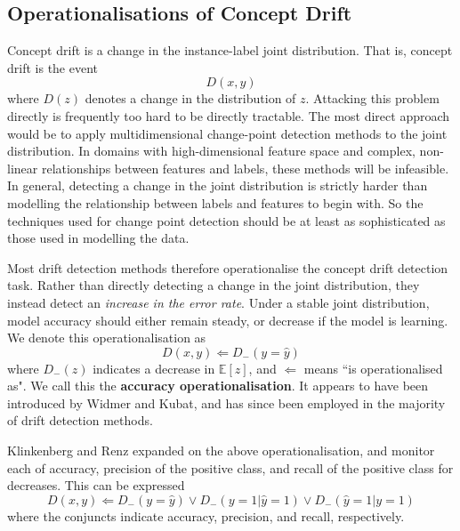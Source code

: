 \subsection{Operationalisations of Concept Drift} \label{Background:operationalisations}

Concept drift is a change in the instance-label joint distribution. That is, concept drift is the event
\begin{equation}
  D(x,y)
\end{equation}
where $D(z)$ denotes a change in the distribution of $z$. Attacking this problem directly is frequently too hard to be directly tractable. The most direct approach would be to apply multidimensional change-point detection methods to the joint distribution. In domains with high-dimensional feature space and complex, non-linear relationships between features and labels, these methods will be infeasible. In general, detecting a change in the joint distribution is strictly harder than modelling the relationship between labels and features to begin with. So the techniques used for change point detection should be at least as sophisticated as those used in modelling the data.

Most drift detection methods therefore operationalise the concept drift detection task. Rather than directly detecting a change in the joint distribution, they instead detect an {\it increase in the error rate}. Under a stable joint distribution, model accuracy should either remain steady, or decrease if the model is learning. We denote this operationalisation as
\begin{equation}
  D(x,y) \Leftarrow D_-(y=\hat{y})
\end{equation}
where $D_-(z)$ indicates a decrease in $\mathds{E}[z]$, and $\Leftarrow$ means ``is operationalised as". We call this the {\bf accuracy operationalisation}. It appears to have been introduced by Widmer and Kubat, and has since been employed in the majority of drift detection methods.

Klinkenberg and Renz expanded on the above operationalisation, and monitor each of accuracy, precision of the positive class, and recall of the positive class for decreases. This can be expressed
\begin{equation}
  D(x,y) \Leftarrow D_-(y=\hat{y}) \vee  D_-(y=1|\hat{y}=1) \vee D_-(\hat{y}=1|y=1)
\end{equation}
where the conjuncts indicate accuracy, precision, and recall, respectively.

